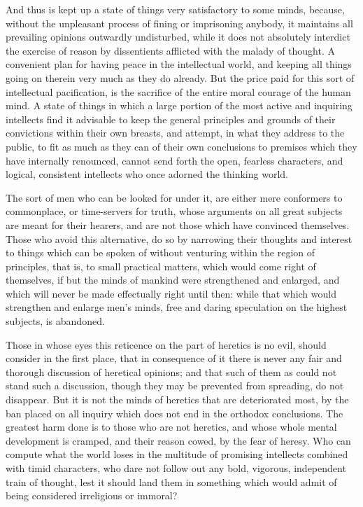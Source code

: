 And thus is kept up a state of things very satisfactory to some minds, because, without the unpleasant process of fining or imprisoning anybody, it maintains all prevailing opinions outwardly undisturbed, while it does not absolutely interdict the exercise of reason by dissentients afflicted with the malady of thought. A convenient plan for having peace in the intellectual world, and keeping all things going on therein very much as they do already. But the price paid for this sort of intellectual pacification, is the sacrifice of the entire moral courage of the human mind. A state of things in which a large portion of the most active and inquiring intellects find it advisable to keep the general principles and grounds of their convictions within their own breasts, and attempt, in what they address to the public, to fit as much as they can of their own conclusions to premises which they have internally renounced, cannot send forth the open, fearless characters, and logical, consistent intellects who once adorned the thinking world.\par

The sort of men who can be looked for under it, are either mere conformers to commonplace, or time-servers for truth, whose arguments on all great subjects are meant for their hearers, and are not those which have convinced themselves. Those who avoid this alternative, do so by narrowing their thoughts and interest to things which can be spoken of without venturing within the region of principles, that is, to small practical matters, which would come right of themselves, if but the minds of mankind were strengthened and enlarged, and which will never be made effectually right until then: while that which would strengthen and enlarge men’s minds, free and daring speculation on the highest subjects, is abandoned.\par

Those in whose eyes this reticence on the part of heretics is no evil, should consider in the first place, that in consequence of it there is never any fair and thorough discussion of heretical opinions; and that such of them as could not stand such a discussion, though they may be prevented from spreading, do not disappear. But it is not the minds of heretics that are deteriorated most, by the ban placed on all inquiry which does not end in the orthodox conclusions. The greatest harm done is to those who are not heretics, and whose whole mental development is cramped, and their reason cowed, by the fear of heresy. Who can compute what the world loses in the multitude of promising intellects combined with timid characters, who dare not follow out any bold, vigorous, independent train of thought, lest it should land them in something which would admit of being considered irreligious or immoral?\par

